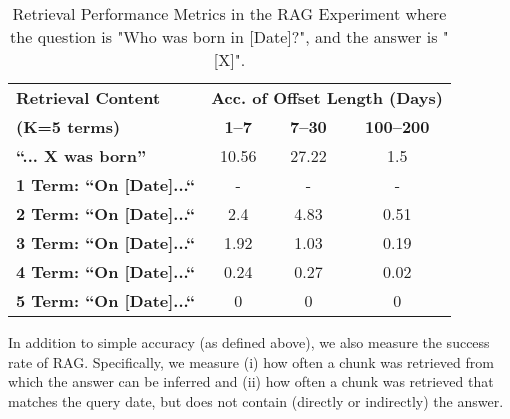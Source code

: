 \documentclass[11pt]{article}
\begin{document}
\begin{table}[ht]
\centering
\caption{Retrieval Performance Metrics in the RAG Experiment where the question is "Who was born in [Date]?", and the answer is "[X]".}
\label{tab:rag-retrieval}
\begin{tabular}{l|ccc}
\hline
\textbf{Retrieval Content } & \multicolumn{3}{c}{\small{\textbf{Acc. of Offset Length (Days)}}} \\
\cline{2-4}
\small{\textbf{(K=5 terms)}}  & \textbf{1--7 }  & \textbf{7--30 } & \textbf{100--200 } \\
\hline
\textbf{``... X was born''} & 10.56 & 27.22 & 1.5 \\
\small{\textbf{1 Term: ``On [Date]...``}} & - & - & - \\
\small{\textbf{2 Term: ``On [Date]...``}} & 2.4 & 4.83 & 0.51 \\
\small{\textbf{3 Term: ``On [Date]...``}} & 1.92 & 1.03 & 0.19 \\
\small{\textbf{4 Term: ``On [Date]...``}} & 0.24 & 0.27 & 0.02 \\
\small{\textbf{5 Term: ``On [Date]...``}} & 0 & 0 & 0 \\
\hline
\end{tabular}
\end{table}

In addition to simple accuracy (as defined above), we also
measure the success rate of RAG. Specifically, we measure
(i) how often a chunk was retrieved from which the answer can be inferred
and (ii) how often a chunk was retrieved that matches the
query date, but does not contain (directly or indirectly)
the answer.

\end{document}
